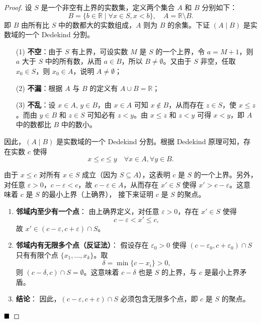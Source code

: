 \begin{proof}
    设 $S$ 是一个非空有上界的实数集，定义两个集合 $A$ 和 $B$ 分别如下：
    \[
    B = \{ b \in \mathbb{R} \mid \forall x \in S, x < b \}, \quad A = \mathbb{R} \setminus B.
    \]
    即 $B$ 由所有比 $S$ 中的数都大的实数组成，$A$ 则为 $B$ 的余集。下证 $(A \mid B)$ 是实数域的一个 Dedekind 分割。
    
    \begin{enumerate}
    \item[(1)] \textbf{不空}：由于 $S$ 有上界，可设实数 $M$ 是 $S$ 的一个上界，令 $a = M + 1$，则 $a$ 大于 $S$ 中的所有数，从而 $a \in B$，所以 $B \neq \emptyset$。又由于 $S$ 非空，任取 $x_0 \in S$，则 $x_0 \in A$，说明 $A \neq \emptyset$；
    
    \item[(2)] \textbf{不漏}：根据 $A$ 与 $B$ 的定义有 $A \cup B = \mathbb{R}$；
    
    \item[(3)] \textbf{不乱}：设 $x \in A$, $y \in B$，由 $x \in A$ 可知 $x \notin B$，从而存在 $z \in S$，使 $x \leq z$。而由 $y \in B$ 和 $z \in S$ 可知必有 $z < y$。由 $x \leq z$ 和 $z < y$ 可得 $x < y$，即 $A$ 中的数都比 $B$ 中的数小。
    \end{enumerate}
    
    因此，$(A \mid B)$ 是实数域的一个 Dedekind 分割。根据 Dedekind 原理可知，存在实数 $c$ 使得
    \[
    x \leq c \leq y \quad \forall x \in A, \forall y \in B.
    \]
    
    由于 $x \leq c$ 对所有 $x \in S$ 成立（因为 $S \subseteq A$），这表明 $c$ 是 $S$ 的一个上界。另外，对任意 $\varepsilon > 0$，$c - \varepsilon < c$，故 $c - \varepsilon \in A$，从而存在 $x' \in S$ 使得 $x' > c - \varepsilon$。这意味着 $c$ 是 $S$ 的最小上界（上确界），
    接下来证明 $c$ 是 $S$ 的聚点。
        \begin{enumerate}
        \item \textbf{邻域内至少有一个点}：
        由上确界定义，对任意 $\varepsilon > 0$，存在 $x' \in S$ 使得
        \[
        c - \varepsilon < x' \leq c,
        \]
        故 $x' \in (c - \varepsilon, c + \varepsilon) \cap S$。
    
        \item \textbf{邻域内有无限多个点（反证法）}：
        假设存在 $\varepsilon_0 > 0$ 使得 $(c - \varepsilon_0, c + \varepsilon_0) \cap S$ 只有有限个点 $\{x_1, \dots, x_k\}$。取
        \[
        \delta = \min\{c - x_i\} > 0,
        \]
        则 $(c - \delta, c) \cap S = \emptyset$。这意味着 $c - \delta$ 也是 $S$ 的上界，与 $c$ 是最小上界矛盾。
    
        \item \textbf{结论}：
        因此，$(c - \varepsilon, c + \varepsilon) \cap S$ 必须包含无限多个点，即 $c$ 是 $S$ 的聚点。
    \end{enumerate}
    
    
    $\hfill \blacksquare$
\end{proof}

